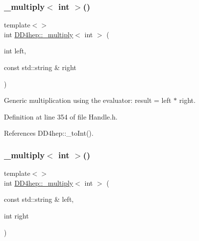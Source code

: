 \subsubsection{\texorpdfstring{\+\_\+multiply$<$ int $>$()}{\_multiply< int >()}\hspace{0.1cm}{\footnotesize\ttfamily [2/3]}}
{\footnotesize\ttfamily template$<$$>$ \\
int \hyperlink{group___d_d4_h_e_p___g_e_o_m_e_t_r_y_gab860c2299e2eb50e537c5079fb0c9c51}{D\+D4hep\+::\+\_\+multiply}$<$ int $>$ (\begin{DoxyParamCaption}\item[{int}]{left,  }\item[{const std\+::string \&}]{right }\end{DoxyParamCaption})\hspace{0.3cm}{\ttfamily [inline]}}



Generic multiplication using the evaluator\+: result = left $\ast$ right. 



Definition at line 354 of file Handle.\+h.



References D\+D4hep\+::\+\_\+to\+Int().

\hypertarget{group___d_d4_h_e_p___g_e_o_m_e_t_r_y_ga8892475189fdc3f4871942f860df0a48}{}\label{group___d_d4_h_e_p___g_e_o_m_e_t_r_y_ga8892475189fdc3f4871942f860df0a48} 
\subsubsection{\texorpdfstring{\+\_\+multiply$<$ int $>$()}{\_multiply< int >()}\hspace{0.1cm}{\footnotesize\ttfamily [3/3]}}
{\footnotesize\ttfamily template$<$$>$ \\
int \hyperlink{group___d_d4_h_e_p___g_e_o_m_e_t_r_y_gab860c2299e2eb50e537c5079fb0c9c51}{D\+D4hep\+::\+\_\+multiply}$<$ int $>$ (\begin{DoxyParamCaption}\item[{const std\+::string \&}]{left,  }\item[{int}]{right }\end{DoxyParamCaption})\hspace{0.3cm}{\ttfamily [inline]}}



